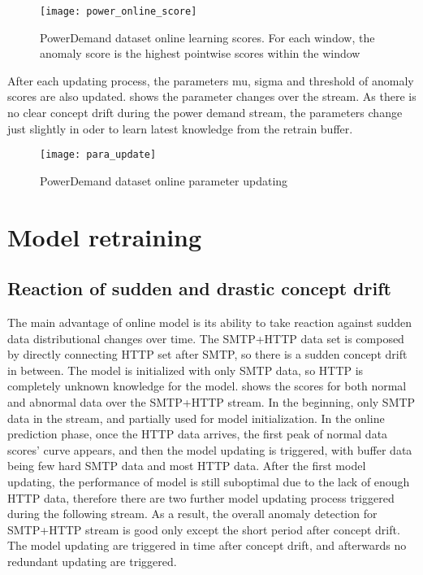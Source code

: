 \begin{figure}[h]
\centering
\texttt{[image: power\_online\_score]}
\caption[PowerDemand dataset online learning scores]{PowerDemand dataset online learning scores. For each window, the anomaly score is the highest pointwise scores within the window}
\label{fig:power_online}
\end{figure}

After each updating process, the parameters mu, sigma and threshold of anomaly scores are also updated.  shows the parameter changes over the stream. As there is no clear concept drift during the power demand stream, the parameters change just slightly in oder to learn latest knowledge from the retrain buffer. 

\begin{figure}[h]
\centering
\texttt{[image: para\_update]}
\caption[PowerDemand dataset online parameter updating]{PowerDemand dataset online parameter updating}
\label{fig:parachanges}
\end{figure}



\section{Model retraining}
\label{sec:retraining}

\subsection{Reaction of sudden and drastic concept drift}
\label{sec:reaction}

The main advantage of online model is its ability to take reaction against sudden data distributional changes over time. The SMTP+HTTP data set is composed by directly connecting HTTP set after SMTP, so there is a sudden concept drift in between. The model is initialized with only SMTP data, so HTTP is completely unknown knowledge for the model.  shows the scores for both normal and abnormal data over the SMTP+HTTP stream. In the beginning, only SMTP data in the stream, and partially used for model initialization. In the online prediction phase, once the HTTP data arrives, the first peak of normal data scores’ curve appears, and then the model updating is triggered, with buffer data being few hard SMTP data and most HTTP data. After the first model updating, the performance of model is still suboptimal due to the lack of enough HTTP data, therefore there are two further model updating process triggered during the following stream. As a result, the overall anomaly detection for SMTP+HTTP stream is good only except the short period after concept drift. The model updating are triggered in time after concept drift, and afterwards no redundant updating are triggered.

